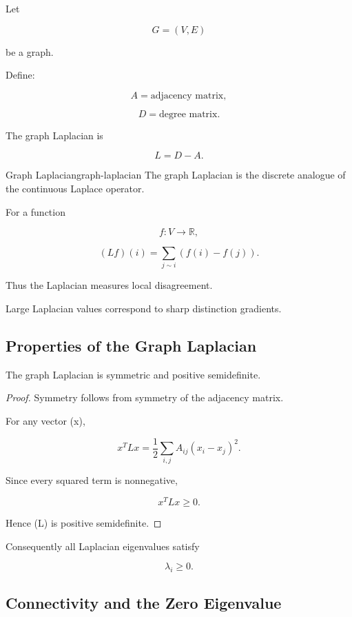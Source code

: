 \documentclass[12pt,twoside,openright]{book}
\begin{document}
Let

\[
G=(V,E)
\]

be a graph.

Define:

\[
A
=

\text{adjacency matrix},
\]

\[
D
=

\text{degree matrix}.
\]

The graph Laplacian is

\[
L
=

D-A.
\]

\begin{definition}{Graph Laplacian}{graph-laplacian}
The graph Laplacian is the discrete analogue of the
continuous Laplace operator.
\end{definition}

For a function

\[
f:V\rightarrow\mathbb R,
\]

\[
(Lf)(i)
=

\sum_{j\sim i}
(f(i)-f(j)).
\]

Thus the Laplacian measures local disagreement.

Large Laplacian values correspond to sharp distinction
gradients.

\subsection{Properties of the Graph Laplacian}

\begin{theorem}
The graph Laplacian is symmetric and positive
semidefinite.
\end{theorem}

\begin{proof}
Symmetry follows from symmetry of the adjacency matrix.

For any vector (x),

\[
x^TLx
=

\frac12
\sum_{i,j}
A_{ij}
(x_i-x_j)^2.
\]

Since every squared term is nonnegative,

\[
x^TLx
\ge0.
\]

Hence (L) is positive semidefinite.
\end{proof}

Consequently all Laplacian eigenvalues satisfy

\[
\lambda_i\ge0.
\]

\subsection{Connectivity and the Zero Eigenvalue}
\end{document}
